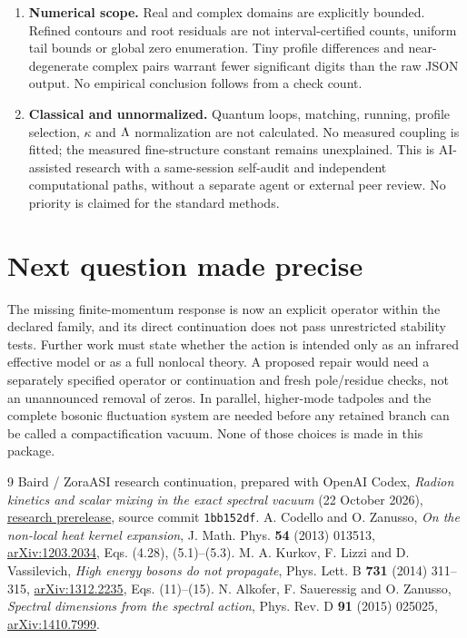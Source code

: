 \begin{enumerate}
\item \textbf{Numerical scope.} Real and complex domains are explicitly bounded. Refined contours and root residuals are not interval-certified counts, uniform tail bounds or global zero enumeration. Tiny profile differences and near-degenerate complex pairs warrant fewer significant digits than the raw JSON output. No empirical conclusion follows from a check count.
\item \textbf{Classical and unnormalized.} Quantum loops, matching, running, profile selection, $\kappa$ and $\Lambda$ normalization are not calculated. No measured coupling is fitted; the measured fine-structure constant remains unexplained. This is AI-assisted research with a same-session self-audit and independent computational paths, without a separate agent or external peer review. No priority is claimed for the standard methods.
\end{enumerate}

\section{Next question made precise}

The missing finite-momentum response is now an explicit operator within the declared family, and its direct continuation does not pass unrestricted stability tests. Further work must state whether the action is intended only as an infrared effective model or as a full nonlocal theory. A proposed repair would need a separately specified operator or continuation and fresh pole/residue checks, not an unannounced removal of zeros. In parallel, higher-mode tadpoles and the complete bosonic fluctuation system are needed before any retained branch can be called a compactification vacuum. None of those choices is made in this package.

\begin{thebibliography}{9}\small
{} Baird / ZoraASI research continuation, prepared with OpenAI Codex,
\emph{Radion kinetics and scalar mixing in the exact spectral vacuum} (22 October 2026),
\href{https://github.com/Cbaird26/mqgt-scf-continued/releases/tag/v2026.10.22-radion-kinetics-scalar-mixing}{research prerelease}, source commit \texttt{1bb152df}.
 A. Codello and O. Zanusso, \emph{On the non-local heat kernel expansion},
J. Math. Phys. \textbf{54} (2013) 013513,
\href{https://arxiv.org/abs/1203.2034}{arXiv:1203.2034}, Eqs. (4.28), (5.1)--(5.3).
 M. A. Kurkov, F. Lizzi and D. Vassilevich,
\emph{High energy bosons do not propagate}, Phys. Lett. B \textbf{731} (2014) 311--315,
\href{https://arxiv.org/abs/1312.2235}{arXiv:1312.2235}, Eqs. (11)--(15).
 N. Alkofer, F. Saueressig and O. Zanusso,
\emph{Spectral dimensions from the spectral action}, Phys. Rev. D \textbf{91} (2015) 025025,
\href{https://arxiv.org/abs/1410.7999}{arXiv:1410.7999}.
\end{thebibliography}
